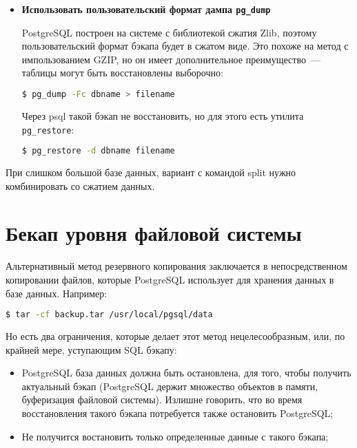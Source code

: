 \begin{itemize}
  \item \textbf{Использовать пользовательский формат дампа \lstinline!pg_dump!}

  PostgreSQL построен на системе с библиотекой сжатия Zlib, поэтому пользовательский формат бэкапа будет в сжатом виде. Это похоже на метод с импользованием GZIP, но он имеет дополнительное преимущество~--- таблицы могут быть восстановлены выборочно:

  \begin{lstlisting}[language=Bash,label=lst:backups12,caption=Создание бэкапа PostgreSQL]
  $ pg_dump -Fc dbname > filename
  \end{lstlisting}

  Через psql такой бэкап не восстановить, но для этого есть утилита \lstinline!pg_restore!:

  \begin{lstlisting}[language=Bash,label=lst:backups13,caption=Восстановление бэкапа PostgreSQL]
  $ pg_restore -d dbname filename
  \end{lstlisting}

\end{itemize}

При слишком большой базе данных, вариант с командой split нужно комбинировать со сжатием данных.


\section{Бекап уровня файловой системы}

Альтернативный метод резервного копирования заключается в непосредственном копировании файлов, которые PostgreSQL использует для хранения данных в базе данных. Например:

\begin{lstlisting}[language=Bash,label=lst:backups14,caption=Бэкап PostgreSQL файлов]
$ tar -cf backup.tar /usr/local/pgsql/data
\end{lstlisting}

Но есть два ограничения, которые делает этот метод нецелесообразным, или, по крайней мере, уступающим SQL бэкапу:

\begin{itemize}
  \item PostgreSQL база данных должна быть остановлена, для того, чтобы получить актуальный бэкап (PostgreSQL держит множество объектов в памяти, буферизация файловой системы). Излишне говорить, что во время восстановления такого бэкапа потребуется также остановить PostgreSQL;
  \item Не получится востановить только определенные данные с такого бэкапа;
\end{itemize}

